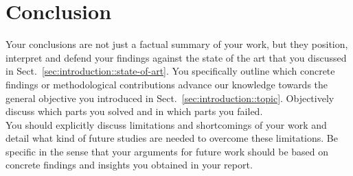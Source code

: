 \documentclass[
	a4paper,
	pagesize,
	pdftex,
	12pt,
	ngerman,
	fleqn,
	final,
	]{scrartcl}
\theoremstyle{plain}
\theoremstyle{definition}
\begin{document}
\section{Conclusion}
		Your conclusions are not just a factual summary of your work, but they position, interpret and defend your findings against the state of the art that you discussed in Sect.~\ref{sec:introduction::state-of-art}. You specifically outline which concrete findings or methodological contributions advance our knowledge towards the general objective you introduced in Sect.~\ref{sec:introduction::topic}. Objectively discuss which parts you solved and in which parts you failed. \\
		You should explicitly discuss limitations and shortcomings of your work and detail what kind of future studies are needed to overcome these limitations. Be specific in the sense that your arguments for future work should be based on concrete findings and insights you obtained in your report.






\selbstaendigkeitserklaerung{\today}
\end{document}
